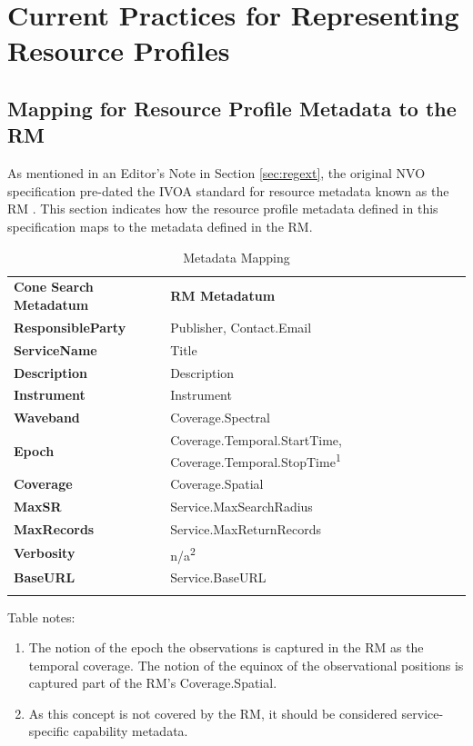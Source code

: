 \documentclass[11pt,a4paper]{ivoa}
\begin{document}
\section{Current Practices for Representing Resource Profiles}

\subsection{Mapping for Resource Profile Metadata to the RM}
As mentioned in an Editor's Note in Section \ref{sec:regext}, the original NVO specification pre-dated the IVOA standard for resource metadata known as the RM \citep{STD:RM101}. This section indicates how the resource profile metadata defined in this specification maps to the metadata defined in the RM.
\begin{table}[th]
\begin{tabular}{p{}p{}}
\sptablerule
\textbf{Cone Search Metadatum} & \textbf{RM Metadatum}\\
\sptablerule
\textbf{ResponsibleParty} & Publisher, Contact.Email\\
\textbf{ServiceName} & Title\\
\textbf{Description} & Description\\
\textbf{Instrument} & Instrument\\
\textbf{Waveband} & Coverage.Spectral\\
\textbf{Epoch} & Coverage.Temporal.StartTime, Coverage.Temporal.StopTime\textsuperscript{1}\\
\textbf{Coverage} & Coverage.Spatial\\
\textbf{MaxSR} & Service.MaxSearchRadius\\
\textbf{MaxRecords} & Service.MaxReturnRecords\\
\textbf{Verbosity} & n/a\textsuperscript{2}\\
\textbf{BaseURL} & Service.BaseURL\\
\sptablerule
\caption{Metadata Mapping}
\label{table:b1meta}
\end{tabular}
\end{table}
Table notes:
\begin{enumerate}
	\item The notion of the epoch the observations is captured in the RM as the temporal coverage. The notion of the equinox of the observational positions is captured part of the RM's Coverage.Spatial.
	\item As this concept is not covered by the RM, it should be considered service-specific capability metadata.
\end{enumerate}
\end{document}
